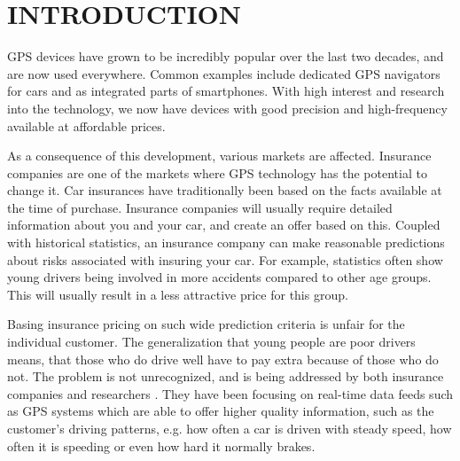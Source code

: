 \section{INTRODUCTION}
\label{sec:intro}

GPS devices have grown to be incredibly popular over the last two decades, and are now used everywhere. Common examples include dedicated GPS navigators for cars and as integrated parts of smartphones. With high interest and research into the technology, we now have devices with good precision and high-frequency available at affordable prices\cite{art:telematicsmatter}.

As a consequence of this development, various markets are affected. Insurance companies are one of the markets where GPS technology has the potential to change it. Car insurances have traditionally been based on the facts available at the time of purchase. Insurance companies will usually require detailed information about you and your car, and create an offer based on this. Coupled with historical statistics, an insurance company can make reasonable predictions about risks associated with insuring your car. For example, statistics often show young drivers being involved in more accidents compared to other age groups\cite{url:forbes}\cite{accidents}. This will usually result in a less attractive price for this group.

Basing insurance pricing on such wide prediction criteria is unfair for the individual customer. The generalization that young people are poor drivers means, that those who do drive well have to pay extra because of those who do not. The problem is not unrecognized, and is being addressed by both insurance companies and researchers \cite{mar:ubi16}. They have been focusing on real-time data feeds such as GPS systems which are able to offer higher quality information, such as the customer's driving patterns, e.g. how often a car is driven with steady speed, how often it is speeding or even how hard it normally brakes.
%

